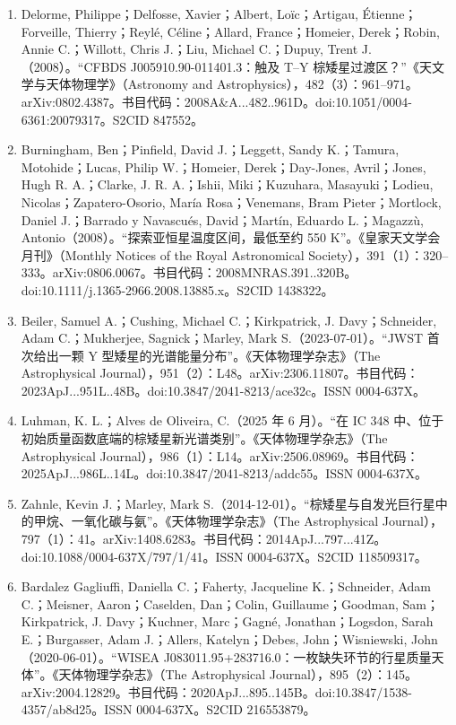 \begin{enumerate}
\item Delorme, Philippe；Delfosse, Xavier；Albert, Loïc；Artigau, Étienne；Forveille, Thierry；Reylé, Céline；Allard, France；Homeier, Derek；Robin, Annie C.；Willott, Chris J.；Liu, Michael C.；Dupuy, Trent J.（2008）。“CFBDS J005910.90-011401.3：触及 T–Y 棕矮星过渡区？”《天文学与天体物理学》（Astronomy and Astrophysics），482（3）：961–971。arXiv:0802.4387。书目代码：2008A&A...482..961D。doi:10.1051/0004-6361:20079317。S2CID 847552。
\item Burningham, Ben；Pinfield, David J.；Leggett, Sandy K.；Tamura, Motohide；Lucas, Philip W.；Homeier, Derek；Day-Jones, Avril；Jones, Hugh R. A.；Clarke, J. R. A.；Ishii, Miki；Kuzuhara, Masayuki；Lodieu, Nicolas；Zapatero-Osorio, María Rosa；Venemans, Bram Pieter；Mortlock, Daniel J.；Barrado y Navascués, David；Martín, Eduardo L.；Magazzù, Antonio（2008）。“探索亚恒星温度区间，最低至约 550 K”。《皇家天文学会月刊》（Monthly Notices of the Royal Astronomical Society），391（1）：320–333。arXiv:0806.0067。书目代码：2008MNRAS.391..320B。doi:10.1111/j.1365-2966.2008.13885.x。S2CID 1438322。
\item Beiler, Samuel A.；Cushing, Michael C.；Kirkpatrick, J. Davy；Schneider, Adam C.；Mukherjee, Sagnick；Marley, Mark S.（2023-07-01）。“JWST 首次给出一颗 Y 型矮星的光谱能量分布”。《天体物理学杂志》（The Astrophysical Journal），951（2）：L48。arXiv:2306.11807。书目代码：2023ApJ...951L..48B。doi:10.3847/2041-8213/ace32c。ISSN 0004-637X。
\item Luhman, K. L.；Alves de Oliveira, C.（2025 年 6 月）。“在 IC 348 中、位于初始质量函数底端的棕矮星新光谱类别”。《天体物理学杂志》（The Astrophysical Journal），986（1）：L14。arXiv:2506.08969。书目代码：2025ApJ...986L..14L。doi:10.3847/2041-8213/addc55。ISSN 0004-637X。
\item Zahnle, Kevin J.；Marley, Mark S.（2014-12-01）。“棕矮星与自发光巨行星中的甲烷、一氧化碳与氨”。《天体物理学杂志》（The Astrophysical Journal），797（1）：41。arXiv:1408.6283。书目代码：2014ApJ...797...41Z。doi:10.1088/0004-637X/797/1/41。ISSN 0004-637X。S2CID 118509317。
\item Bardalez Gagliuffi, Daniella C.；Faherty, Jacqueline K.；Schneider, Adam C.；Meisner, Aaron；Caselden, Dan；Colin, Guillaume；Goodman, Sam；Kirkpatrick, J. Davy；Kuchner, Marc；Gagné, Jonathan；Logsdon, Sarah E.；Burgasser, Adam J.；Allers, Katelyn；Debes, John；Wisniewski, John（2020-06-01）。“WISEA J083011.95+283716.0：一枚缺失环节的行星质量天体”。《天体物理学杂志》（The Astrophysical Journal），895（2）：145。arXiv:2004.12829。书目代码：2020ApJ...895..145B。doi:10.3847/1538-4357/ab8d25。ISSN 0004-637X。S2CID 216553879。

\end{enumerate}
